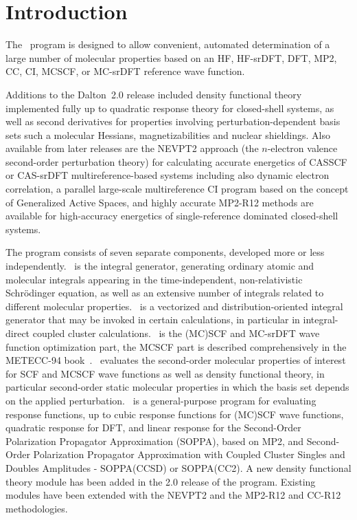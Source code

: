 \chapter{Introduction}\label{ch:intro}

The \dalton\ program is designed to allow convenient,
automated determination of a large number of molecular properties
based on an HF, HF-srDFT, DFT, MP2, CC,
CI, MCSCF, or MC-srDFT reference wave function.

Additions to the Dalton~2.0 release included
density functional theory implemented fully up to quadratic response
theory for closed-shell systems, as well as second derivatives for
properties involving perturbation-dependent basis sets such a
molecular Hessians, magnetizabilities and nuclear shieldings.
Also available from later releases are the NEVPT2 approach
(the $n$-electron valence second-order perturbation theory) for
calculating  accurate energetics of
CASSCF or CAS-srDFT multireference-based systems including also dynamic electron
correlation, a parallel large-scale multireference CI program based on the concept of
Generalized Active Spaces, and highly accurate MP2-R12
 methods are available for high-accuracy energetics of
single-reference dominated closed-shell systems.

The program consists of seven separate components, developed more or less independently.
\her\ is the integral generator, generating ordinary
atomic and molecular integrals appearing in the
time-independent, non-relativistic Schr\"{o}dinger equation, as well as
an extensive number of integrals related to different molecular
properties. \eri\ is a vectorized and distribution-oriented integral
generator that may be invoked in certain calculations, in particular in
integral-direct coupled cluster calculations. \sir\ is the (MC)SCF and MC-srDFT wave
function optimization part, the MCSCF part is described comprehensively in the
METECC-94 book~\cite{hjajhajomotecc}. \aba\ evaluates the second-order
molecular properties of interest for SCF and MCSCF wave functions as
well as density functional theory, in particular second-order static
molecular properties in which the basis set depends on the applied
perturbation. \resp\ is a general-purpose program for evaluating
response functions, up to cubic response functions for (MC)SCF wave
functions, quadratic response for DFT, and linear response for the
Second-Order Polarization Propagator Approximation (SOPPA), based on MP2, and
Second-Order Polarization Propagator Approximation with Coupled Cluster
Singles and Doubles Amplitudes - SOPPA(CCSD) or SOPPA(CC2). A new
density functional theory module has been added in the 2.0 release of
the program. Existing modules have been extended with the NEVPT2 and
the MP2-R12 and CC-R12 methodologies.

